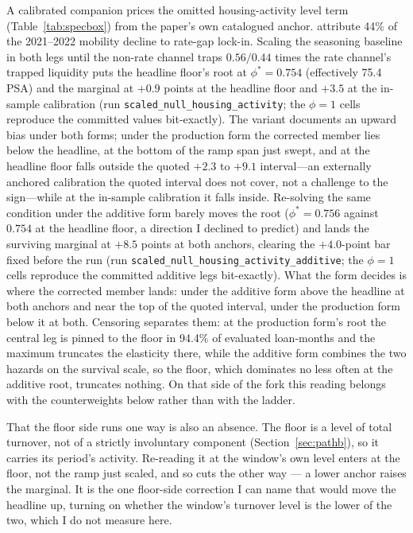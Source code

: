 A calibrated companion prices the omitted housing-activity level term (Table~\ref{tab:specbox}) from the paper's own catalogued anchor. \citet{aladangady2024} attribute 44\% of the 2021--2022 mobility decline to rate-gap lock-in. Scaling the seasoning baseline in both legs until the non-rate channel traps $0.56/0.44$ times the rate channel's trapped liquidity puts the headline floor's root at $\phi^{*} = 0.754$ (effectively 75.4 PSA) and the marginal at $+0.9$ points at the headline floor and $+3.5$ at the in-sample calibration (run \texttt{scaled\_null\_housing\_activity}; the $\phi = 1$ cells reproduce the committed values bit-exactly). The variant documents an upward bias under both forms; under the production form the corrected member lies below the headline, at the bottom of the ramp span just swept, and at the headline floor falls outside the quoted $+2.3$ to $+9.1$ interval---an externally anchored calibration the quoted interval does not cover, not a challenge to the sign---while at the in-sample calibration it falls inside. Re-solving the same condition under the additive form barely moves the root ($\phi^{*} = 0.756$ against $0.754$ at the headline floor, a direction I declined to predict) and lands the surviving marginal at $+8.5$ points at both anchors, clearing the $+4.0$-point bar fixed before the run (run \texttt{scaled\_null\_housing\_activity\_additive}; the $\phi = 1$ cells reproduce the committed additive legs bit-exactly). What the form decides is where the corrected member lands: under the additive form above the headline at both anchors and near the top of the quoted interval, under the production form below it at both. Censoring separates them: at the production form's root the central leg is pinned to the floor in 94.4\% of evaluated loan-months and the maximum truncates the elasticity there, while the additive form combines the two hazards on the survival scale, so the floor, which dominates no less often at the additive root, truncates nothing. On that side of the fork this reading belongs with the counterweights below rather than with the ladder.

That the floor side runs one way is also an absence. The floor is a level of total turnover, not of a strictly involuntary component (Section~\ref{sec:pathb}), so it carries its period's activity. Re-reading it at the window's own level enters at the floor, not the ramp just scaled, and so cuts the other way --- a lower anchor raises the marginal. It is the one floor-side correction I can name that would move the headline up, turning on whether the window's turnover level is the lower of the two, which I do not measure here.

